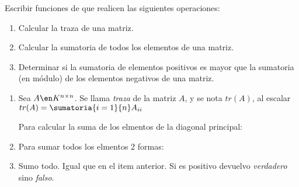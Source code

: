 \begin{enunciado}{\ejercicio}
  Escribir funciones de \texttt{\python} que realicen las siguientes operaciones:
  \begin{enumerate}[label=(\alph*)]
    \item Calcular la traza de una matriz.

    \item Calcular la sumatoria de todos los elementos de una matriz.

    \item Determinar si la sumatoria de elementos positivos es mayor que la sumatoria (en módulo)
          de los elementos negativos de una matriz.
  \end{enumerate}
\end{enunciado}

\begin{enumerate}[label=(\alph*)]
  \item Sea $A \en K^{n \times n}$. Se llama \textit{traza} de la matriz $A$, y se nota $tr(A)$, al
        escalar $tr(A) = \sumatoria{i=1}{n}A_{ii}$

        Para calcular la suma de los elmentos de la diagonal principal:
        \copyPaste

  \item Para sumar todos los elmentos 2 formas:

  \item Sumo todo. Igual que en el item anterior. Si es positivo devuelvo \textit{verdadero} sino \textit{falso}.
\end{enumerate}

\begin{aportes}
  \item {}
\end{aportes}
